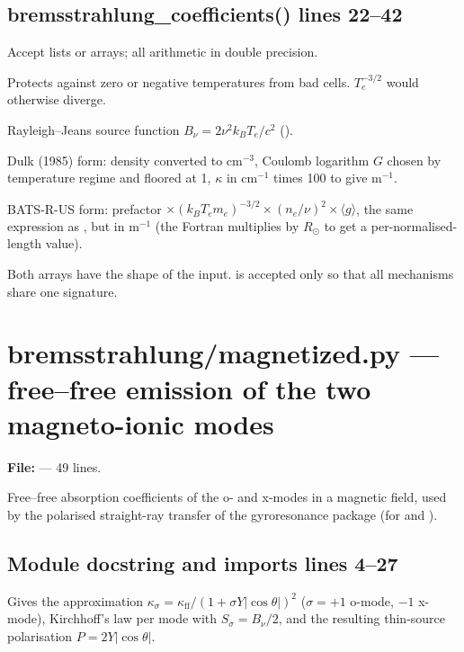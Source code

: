\section*{\normalsize bremsstrahlung\_coefficients() \hfill{\small\mdseries\color{gray}lines 22--42}}

\begin{lines}
\item[L.26] Accept lists or arrays; all arithmetic in double precision.
\item[L.27] Protects against zero or negative temperatures from bad cells. $T_e^{-3/2}$ would otherwise diverge.
\item[L.28] Rayleigh--Jeans source function $B_\nu=2\nu^2k_BT_e/c^2$ ().
\item[L.29–32] Dulk (1985) form: density converted to cm$^{-3}$, Coulomb logarithm $G$ chosen by temperature regime and floored at 1, $\kappa$ in cm$^{-1}$ times 100 to give m$^{-1}$.
\item[L.40–41] BATS-R-US form: prefactor $\times(k_BT_em_e)^{-3/2}\times(n_e/\nu)^2\times\langle g\rangle$, the same expression as , but in m$^{-1}$ (the Fortran multiplies by $R_\odot$ to get a per-normalised-length value).
\item[L.42] Both arrays have the shape of the input.  is accepted only so that all mechanisms share one signature.
\end{lines}

\chapter{bremsstrahlung/magnetized.py --- free--free emission of the two magneto-ionic modes}
\label{mod:bremsstrahlung:magnetized.py}
\textbf{File:}  --- 49 lines.

Free--free absorption coefficients of the o- and x-modes in a magnetic field, used by
the polarised straight-ray transfer of the gyroresonance package (for
 and ).

\section*{\normalsize Module docstring and imports \hfill{\small\mdseries\color{gray}lines 4--27}}

Gives the approximation $\kappa_\sigma=\kappa_\text{ff}/(1+\sigma Y|\cos\theta|)^2$ ($\sigma=+1$ o-mode, $-1$ x-mode), Kirchhoff's law per mode with $S_\sigma=B_\nu/2$, and the resulting thin-source polarisation $P=2Y|\cos\theta|$.

